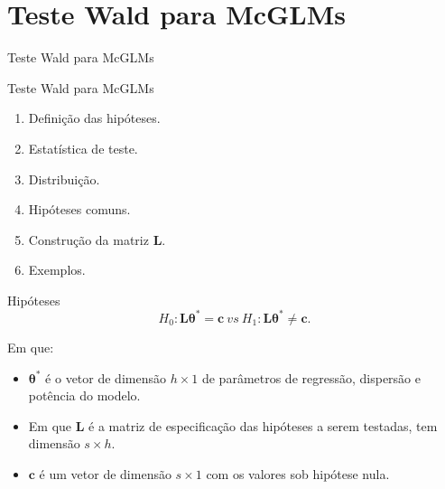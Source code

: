\documentclass[
  ignorenonframetext,
  serif,
  professionalfont,
  usenames,
  dvipsnames,
  aspectratio = 169]{beamer}
\begin{document}
\hypertarget{teste-wald-para-mcglms}{%
\section{Teste Wald para McGLMs}\label{teste-wald-para-mcglms}}

\begin{frame}{Teste Wald para McGLMs}
\end{frame}

\begin{frame}{Teste Wald para McGLMs}
\protect\hypertarget{teste-wald-para-mcglms-1}{}
\begin{enumerate}
  \itemsep 2ex
    
  \item Definição das hipóteses.
  \item Estatística de teste.
  \item Distribuição.
  \item Hipóteses comuns.
  \item Construção da matriz $\boldsymbol{L}$.
  \item Exemplos.
  
\end{enumerate}
\end{frame}

\begin{frame}{Hipóteses}
\protect\hypertarget{hipuxf3teses}{}
\[H_0: \boldsymbol{L}\boldsymbol{\theta^{*}} = \boldsymbol{c} \ vs \ H_1: \boldsymbol{L}\boldsymbol{\theta^{*}} \neq \boldsymbol{c}.\]

Em que:

\begin{itemize}
  
  \item $\boldsymbol{\theta^{*}}$ é o vetor de dimensão $h \times 1$ de parâmetros de regressão, dispersão e potência do modelo. 
  
  \item Em que $\boldsymbol{L}$ é a matriz de especificação das hipóteses a serem testadas, tem dimensão $s \times h$. 
  
  \item $\boldsymbol{c}$ é um vetor de dimensão $s \times 1$ com os valores sob hipótese nula.

\end{itemize}
\end{frame}
\end{document}
